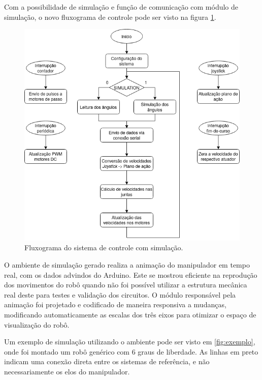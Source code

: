 Com a possibilidade de simulação e função de comunicação com módulo de simulação, o 
novo fluxograma de controle pode ser visto na figura \ref{fig:fluxograma2}. 

\begin{figure}[h]
    \caption{Fluxograma do sistema de controle com simulação.}

    \begin{centering}
        \includegraphics[width=0.7\columnwidth]{images/controle/fluxo2.png} 
    \par\end{centering}

    \label{fig:fluxograma2}
\end{figure}

O ambiente de simulação gerado realiza a animação do manipulador em tempo real, com os dados advindos
do Arduino. Este se mostrou eficiente na reprodução dos movimentos do robô quando não
foi possível utilizar a estrutura mecânica real deste para testes e validação dos circuitos. 
O módulo responsável pela animação foi projetado e codificado de maneira responsiva a mudanças, 
modificando automaticamente as escalas dos três eixos para otimizar o espaço de visualização do robô.

Um exemplo de simulação utilizando o ambiente pode ser visto em \ref{fig:exemplo}, onde foi montado 
um robô genérico com 6 graus de liberdade. As linhas em preto indicam uma conexão direta entre os sistemas 
de referência, e não necessariamente os elos do manipulador.

